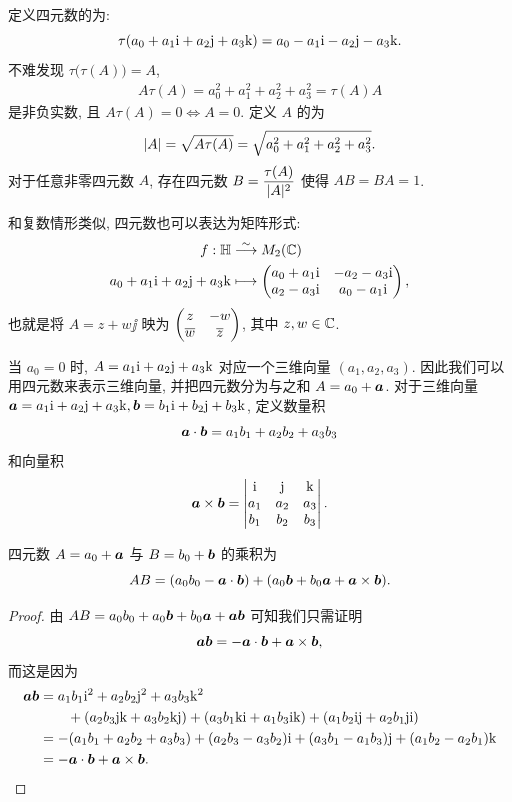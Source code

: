 定义四元数的为:
\[
  \tau(a_0+a_1\mathrm{i}+a_2\mathrm{j}+a_3\mathrm{k})
  =a_0-a_1\mathrm{i}-a_2\mathrm{j}-a_3\mathrm{k}.
\]
不难发现 $\tau\bigl(\tau(A)\bigr)=A$,
\begin{align*}
   A\tau(A)
  =a_0^2+a_1^2+a_2^2+a_3^2
  =\tau(A)A
\end{align*}
是非负实数, 且 $A\tau(A)=0\iff A=0$. 
定义 $A$ 的为
\[
  \lvert A\rvert=\sqrt{A\tau(A)}=\sqrt{a_0^2+a_1^2+a_2^2+a_3^2}.
\]
对于任意非零四元数 $A$, 存在四元数 $B=\dfrac{\tau(A)}{\lvert A\rvert^2}$ 使得 $AB=BA=1$. 

和复数情形类似, 四元数也可以表达为矩阵形式:
\begin{equation}
  \label{eq:quaternion-matrix}
  \begin{aligned}
    f:{\mathbb{H}}&\stackrel{\sim}{\longrightarrow} M_2({\mathbb{C}})\\
    a_0+a_1\mathrm{i}+a_2\mathrm{j}+a_3\mathrm{k}&\longmapsto \begin{pmatrix}
      a_0+a_1\mathrm{i}&-a_2-a_3\mathrm{i}\\
      a_2-a_3\mathrm{i}&a_0-a_1\mathrm{i}
    \end{pmatrix},
  \end{aligned}
\end{equation}
也就是将 $A=z+w\jj$ 映为 $\begin{pmatrix}
  z&-w\\\overline w&\overline z
\end{pmatrix}$, 其中 $z,w\in{\mathbb{C}}$.

当 $a_0=0$ 时, $A=a_1\mathrm{i}+a_2\mathrm{j}+a_3\mathrm{k}$ 对应一个三维向量 $(a_1,a_2,a_3)$.
因此我们可以用四元数来表示三维向量, 并把四元数分为与之和 $A=a_0+{\boldsymbol{a}}$.
对于三维向量 ${\boldsymbol{a}}=a_1\mathrm{i}+a_2\mathrm{j}+a_3\mathrm{k}, {\boldsymbol{b}}=b_1\mathrm{i}+b_2\mathrm{j}+b_3\mathrm{k}$, 定义数量积
\[
  {\boldsymbol{a}}\cdot{\boldsymbol{b}}=a_1b_1+a_2b_2+a_3b_3
\]
和向量积
\[
  {\boldsymbol{a}}\times{\boldsymbol{b}}=\begin{vmatrix}
    \mathrm{i}&\mathrm{j}&\mathrm{k}\\
    a_1&a_2&a_3\\
    b_1&b_2&b_3
  \end{vmatrix}.
\]

\begin{theorem}
  四元数 $A=a_0+{\boldsymbol{a}}$ 与 $B=b_0+{\boldsymbol{b}}$ 的乘积为
  \[
    AB=(a_0b_0-{\boldsymbol{a}}\cdot{\boldsymbol{b}})+(a_0{\boldsymbol{b}}+b_0{\boldsymbol{a}}+{\boldsymbol{a}}\times{\boldsymbol{b}}).
  \]
\end{theorem}

\begin{proof}
  由 $AB=a_0b_0+a_0{\boldsymbol{b}}+b_0{\boldsymbol{a}}+{\boldsymbol{a}}{\boldsymbol{b}}$ 可知我们只需证明
  \[
    {\boldsymbol{a}}{\boldsymbol{b}}=-{\boldsymbol{a}}\cdot{\boldsymbol{b}}+{\boldsymbol{a}}\times{\boldsymbol{b}},
  \]
  而这是因为
  \begin{align*}
     {\boldsymbol{a}}{\boldsymbol{b}}&
    =a_1b_1\mathrm{i}^2+a_2b_2\mathrm{j}^2+a_3b_3\mathrm{k}^2\\&
      \qquad
      +(a_2b_3\mathrm{j}\mathrm{k}+a_3b_2\mathrm{k}\mathrm{j})
      +(a_3b_1\mathrm{k}\mathrm{i}+a_1b_3\mathrm{i}\mathrm{k})
      +(a_1b_2\mathrm{i}\mathrm{j}+a_2b_1\mathrm{j}\mathrm{i})\\&
    =-(a_1b_1+a_2b_2+a_3b_3)
      +(a_2b_3-a_3b_2)\mathrm{i}
      +(a_3b_1-a_1b_3)\mathrm{j}
      +(a_1b_2-a_2b_1)\mathrm{k}\\&
    =-{\boldsymbol{a}}\cdot{\boldsymbol{b}}+{\boldsymbol{a}}\times{\boldsymbol{b}}.\qedhere
  \end{align*}
\end{proof}

